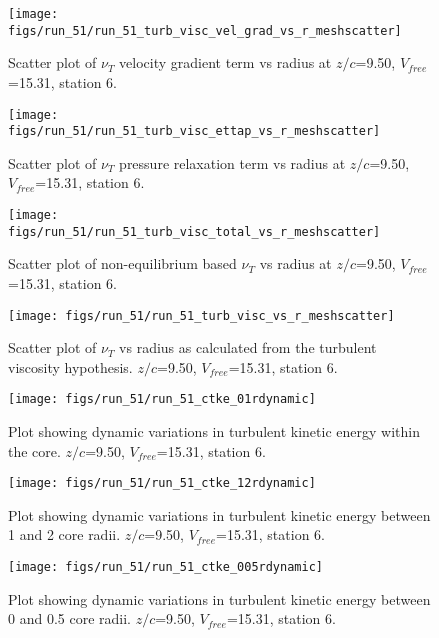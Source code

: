 \begin{figure}[H]
\centering
\texttt{[image: figs/run\_51/run\_51\_turb\_visc\_vel\_grad\_vs\_r\_meshscatter]}
\caption{Scatter plot of $\nu_T$ velocity gradient term vs radius at $z/c$=9.50, $V_{free}$=15.31, station 6.}
\end{figure}


\begin{figure}[H]
\centering
\texttt{[image: figs/run\_51/run\_51\_turb\_visc\_ettap\_vs\_r\_meshscatter]}
\caption{Scatter plot of $\nu_T$ pressure relaxation term vs radius at $z/c$=9.50, $V_{free}$=15.31, station 6.}
\end{figure}


\begin{figure}[H]
\centering
\texttt{[image: figs/run\_51/run\_51\_turb\_visc\_total\_vs\_r\_meshscatter]}
\caption{Scatter plot of non-equilibrium based $\nu_T$ vs radius at $z/c$=9.50, $V_{free}$=15.31, station 6.}
\end{figure}


\begin{figure}[H]
\centering
\texttt{[image: figs/run\_51/run\_51\_turb\_visc\_vs\_r\_meshscatter]}
\caption{Scatter plot of $\nu_T$ vs radius as calculated from the turbulent viscosity hypothesis. $z/c$=9.50, $V_{free}$=15.31, station 6.}
\end{figure}


\begin{figure}[H]
\centering
\texttt{[image: figs/run\_51/run\_51\_ctke\_01rdynamic]}
\caption{Plot showing dynamic variations in turbulent kinetic energy within the core. $z/c$=9.50, $V_{free}$=15.31, station 6.}
\end{figure}


\begin{figure}[H]
\centering
\texttt{[image: figs/run\_51/run\_51\_ctke\_12rdynamic]}
\caption{Plot showing dynamic variations in turbulent kinetic energy between 1 and 2 core radii. $z/c$=9.50, $V_{free}$=15.31, station 6.}
\end{figure}


\begin{figure}[H]
\centering
\texttt{[image: figs/run\_51/run\_51\_ctke\_005rdynamic]}
\caption{Plot showing dynamic variations in turbulent kinetic energy between 0 and 0.5 core radii. $z/c$=9.50, $V_{free}$=15.31, station 6.}
\end{figure}


